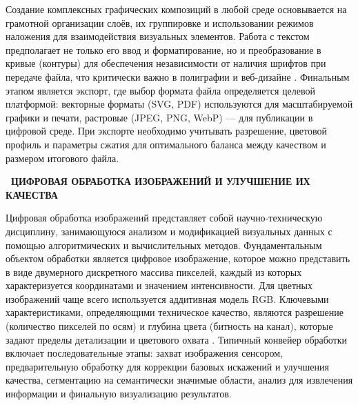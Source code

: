 \documentclass{SibFU-docs}
\begin{document}

Создание комплексных графических композиций в любой среде основывается на грамотной организации слоёв, их группировке и использовании режимов наложения для взаимодействия визуальных элементов. Работа с текстом предполагает не только его ввод и форматирование, но и преобразование в кривые (контуры) для обеспечения независимости от наличия шрифтов при передаче файла, что критически важно в полиграфии и веб-дизайне \cite{adobe-helpx}. Финальным этапом является экспорт, где выбор формата файла определяется целевой платформой: векторные форматы (SVG, PDF) используются для масштабируемой графики и печати, растровые (JPEG, PNG, WebP) — для публикации в цифровой среде. При экспорте необходимо учитывать разрешение, цветовой профиль и параметры сжатия для оптимального баланса между качеством и размером итогового файла.

\newpage
{}
\begin{center}\textbf{\thesection\ ЦИФРОВАЯ ОБРАБОТКА ИЗОБРАЖЕНИЙ И УЛУЧШЕНИЕ ИХ КАЧЕСТВА}\end{center}
\vspace*{-1.5em}

Цифровая обработка изображений представляет собой научно-техническую дисциплину, занимающуюся анализом и модификацией визуальных данных с помощью алгоритмических и вычислительных методов. Фундаментальным объектом обработки является цифровое изображение, которое можно представить в виде двумерного дискретного массива пикселей, каждый из которых характеризуется координатами и значением интенсивности. Для цветных изображений чаще всего используется аддитивная модель RGB. Ключевыми характеристиками, определяющими техническое качество, являются разрешение (количество пикселей по осям) и глубина цвета (битность на канал), которые задают пределы детализации и цветового охвата \cite{gonzalez2018digital}. Типичный конвейер обработки включает последовательные этапы: захват изображения сенсором, предварительную обработку для коррекции базовых искажений и улучшения качества, сегментацию на семантически значимые области, анализ для извлечения информации и финальную визуализацию результатов.

\end{document}
